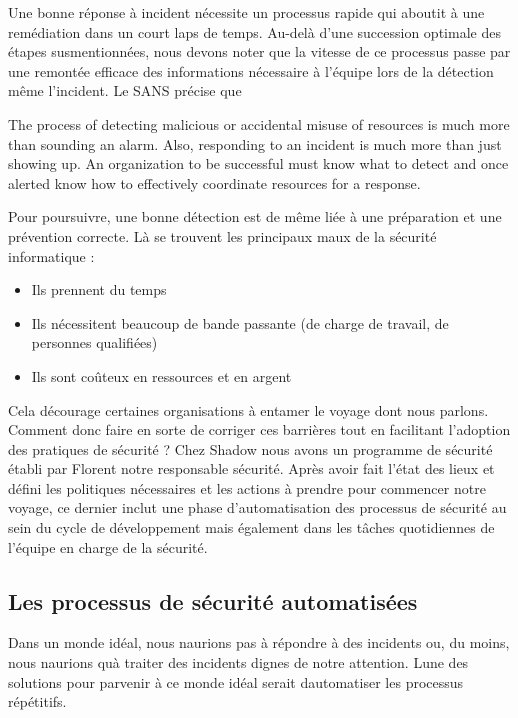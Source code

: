 \documentclass[
  11pt,
  a4paper,
  krantz2,
  11pt,
  oneside]{krantz}
\renewenvironment{quote}{\begin{VF}}{\end{VF}}
\begin{document}
Une bonne réponse à incident nécessite un processus rapide qui aboutit à une remédiation dans un court laps de temps. Au-delà d'une succession optimale des étapes susmentionnées, nous devons noter que la vitesse de ce processus passe par une remontée efficace des informations nécessaire à l'équipe lors de la détection même l'incident. Le SANS précise que

\begin{quote}
The process of detecting malicious or accidental misuse of resources is much more than sounding an alarm. Also, responding to an incident is much more than just showing up. An organization to be successful must know what to detect and once alerted know how to effectively coordinate resources for a response.
\end{quote}

Pour poursuivre, une bonne détection est de même liée à une préparation et une prévention correcte. Là se trouvent les principaux maux de la sécurité informatique :

\begin{itemize}
\item
  Ils prennent du temps
\item
  Ils nécessitent beaucoup de bande passante (de charge de travail, de personnes qualifiées)
\item
  Ils sont coûteux en ressources et en argent
\end{itemize}

Cela décourage certaines organisations à entamer le voyage dont nous parlons. Comment donc faire en sorte de corriger ces barrières tout en facilitant l'adoption des pratiques de sécurité ? Chez Shadow nous avons un programme de sécurité établi par Florent notre responsable sécurité. Après avoir fait l'état des lieux et défini les politiques nécessaires et les actions à prendre pour commencer notre voyage, ce dernier inclut une phase d'automatisation des processus de sécurité au sein du cycle de développement mais également dans les tâches quotidiennes de l'équipe en charge de la sécurité.

\subsection{Les processus de sécurité automatisées}\label{les-processus-de-suxe9curituxe9-automatisuxe9es}

Dans un monde idéal, nous n\textquotesingle aurions pas à répondre à des incidents ou, du moins, nous n\textquotesingle aurions qu\textquotesingle à traiter des incidents dignes de notre attention. L\textquotesingle une des solutions pour parvenir à ce monde idéal serait d\textquotesingle automatiser les processus répétitifs.
\end{document}
